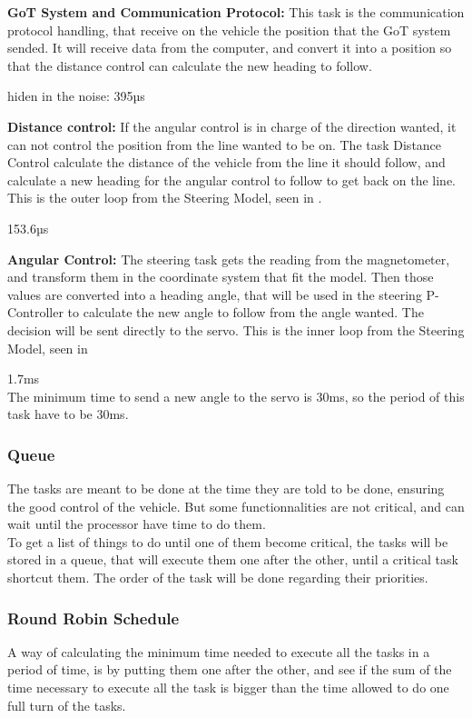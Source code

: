 \textbf{GoT System and Communication Protocol:}
This task is the communication protocol handling, that receive on the vehicle the position that the GoT system sended. It will receive data from the computer, and convert it into a position so that the distance control can calculate the new heading to follow.

hiden in the noise: 395µs	

\textbf{Distance control:}
If the angular control is in charge of the direction wanted, it can not control the position from the line wanted to be on. The task Distance Control calculate the distance of the vehicle from the line it should follow, and calculate a new heading for the angular control to follow to get back on the line. This is the outer loop from the Steering Model, seen in .


153.6µs

\textbf{Angular Control:}
The steering task gets the reading from the magnetometer, and transform them in the coordinate system that fit the model. Then those values are converted into a heading angle, that will be used in the steering P-Controller to calculate the new angle to follow from the angle wanted. The decision will be sent directly to the servo. This is the inner loop from the Steering Model, seen in 

1.7ms\\ 

The minimum time to send a new angle to the servo is 30ms, so the period of this task have to be 30ms.




\subsubsection{Queue}
The tasks are meant to be done at the time they are told to be done, ensuring the good control of the vehicle. But some functionnalities are not critical, and can wait until the processor have time to do them.\\
To get a list of things to do until one of them become critical, the tasks will be stored in a queue, that will execute them one after the other, until a critical task shortcut them. The order of the task will be done regarding their priorities.


\subsubsection{Round Robin Schedule}
A way of calculating the minimum time needed to execute all the tasks in a period of time, is by putting them one after the other, and see if the sum of the time necessary to execute all the task is bigger than the time allowed to do one full turn of the tasks.

